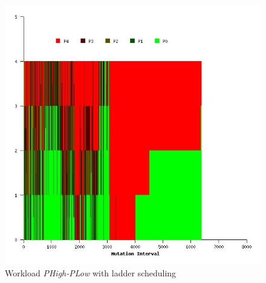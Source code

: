\begin{figure}
  \begin{center}
    \includegraphics[scale=0.4]{figures/mutation_timeline_figures/mut_t0/PHigh-PLow/125_4.jpeg}%
    \caption{Workload \textit{PHigh-PLow} with ladder scheduling}
    \label{fig:wrk_phighplow_ladder}
  \end{center}
\end{figure}

